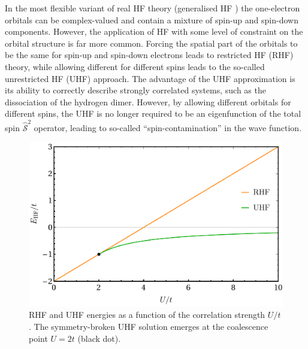 \documentclass[aps,prb,reprint,noshowkeys,superscriptaddress]{revtex4-1}
\newcommand{\hugh}[1]{\textcolor{hughgreen}{#1}}
\begin{document}
In the most flexible variant of real HF theory (generalised HF \cite{Mayer_1993}) the one-electron orbitals can be complex-valued
and contain a mixture of spin-up and spin-down components.\cite{Mayer_1993}
However, the application of HF with some level of constraint on the orbital structure is far more common.
Forcing the spatial part of the orbitals to be the same for spin-up and spin-down electrons leads to restricted HF (RHF) theory, while allowing different for different spins leads to the so-called unrestricted HF (UHF) approach.
The advantage of the UHF approximation is its ability to correctly describe strongly correlated systems, 
such as the dissociation of the hydrogen dimer.\cite{Coulson_1949}
However, by allowing different orbitals for different spins, the UHF is no longer required to be an eigenfunction of 
the total spin $\hat{\mathcal{S}}^2$ operator, leading to so-called ``spin-contamination'' in the wave function.

%
%

\begin{figure}
    \includegraphics[width=\linewidth]{HF_real.pdf}
    \caption{\label{fig:HF_real}
    \hugh{RHF and UHF energies as a function of the correlation strength $U/t$. 
    The symmetry-broken UHF solution emerges at the coalescence point $U=2t$ (black dot).}}
\end{figure}
\end{document}
